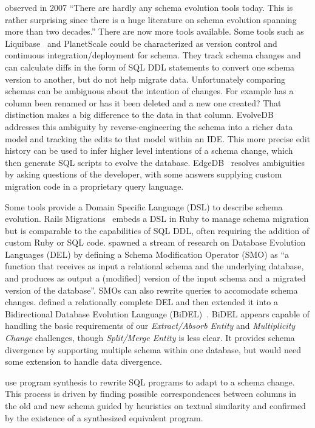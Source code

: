 \documentclass[english,submission]{programming}
\begin{document}
\citet{bernstein07} observed in 2007 ``There are hardly any schema evolution tools today. This is rather surprising since there is a huge literature on schema evolution spanning more than two decades.'' There are now more tools available. Some tools such as Liquibase~\cite{liquibase} and PlanetScale\cite{planetscale} could be characterized as version control and continuous integration/deployment for schema. They track schema changes and can calculate diffs in the form of SQL DDL statements to convert one schema version to another, but do not help migrate data. Unfortunately comparing schemas can be ambiguous about the intention of changes. For example has a column been renamed or has it been deleted and a new one created? That distinction makes a big difference to the data in that column. EvolveDB\cite{evolvedb} addresses this ambiguity by reverse-engineering the schema into a richer data model and tracking the edits to that model within an IDE. This more precise edit history can be used to infer higher level intentions of a schema change, which then generate SQL scripts to evolve the database. EdgeDB~\cite{edgedb} resolves ambiguities by asking questions of the developer, with some answers supplying custom migration code in a proprietary query language.

Some tools provide a Domain Specific Language (DSL) to describe schema evolution. Rails Migrations~\cite{RailsMigrations} embeds a DSL in Ruby to manage schema migration but is comparable to the capabilities of SQL DDL, often requiring the addition of custom Ruby or SQL code. \citet{curino08} spawned a stream of research on Database Evolution Languages (DEL) by defining a Schema Modification Operator (SMO) as ``a function that receives as input a relational schema and the underlying database, and produces as output a (modified) version of the input schema and a migrated version of the database''. SMOs can also rewrite queries to accomodate schema changes. \citet{herrmann15} defined a relationally complete DEL and then extended it into a Bidirectional Database Evolution Language (BiDEL)~\cite{herrmann17}. BiDEL appears capable of handling the basic requirements of our \emph{Extract/Absorb Entity} and \emph{Multiplicity Change} challenges, though \emph{Split/Merge Entity} is less clear. It provides schema divergence by supporting multiple schema within one database, but would need some extension to handle data divergence.

\citet{wang19} use program synthesis to rewrite SQL programs to adapt to a schema change. This process is driven by finding possible correspondences between columns in the old and new schema guided by heuristics on textual similarity and confirmed by the existence of a synthesized equivalent program.

\end{document}
